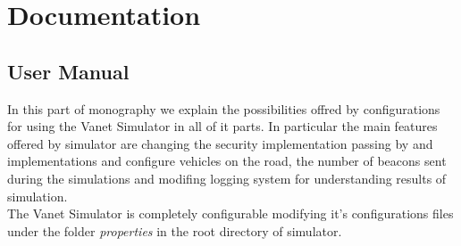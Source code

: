 \section{Documentation}
\subsection{User Manual}
In this part of monography we explain the possibilities offred by configurations for using the Vanet Simulator in all of it parts. In particular the main features offered by simulator are changing the security implementation passing by \baseline and \hybrid implementations and configure vehicles on the road, the number of beacons sent during the simulations and modifing logging system for understanding results of simulation.\\
The Vanet Simulator is completely configurable modifying it's configurations files under the folder \textit{properties} in the root directory of simulator.

